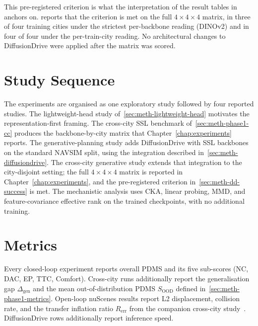 \noindent
This pre-registered criterion is what the interpretation of the result tables in  anchors on.  reports that the criterion is met on the full $4 \times 4 \times 4$ matrix, in three of four training cities under the strictest per-backbone reading (DINOv2) and in four of four under the per-train-city reading. No architectural changes to DiffusionDrive were applied after the matrix was scored.

\section{Study Sequence}
\label{sec:meth-exp-protocol}

The experiments are organised as one exploratory study followed by four reported studies. The lightweight-head study of~\ref{sec:meth-lightweight-head} motivates the representation-first framing. The cross-city SSL benchmark of~\ref{sec:meth-phase1-cc} produces the backbone-by-city matrix that Chapter~\ref{chap:experiments} reports. The generative-planning study adds DiffusionDrive with SSL backbones on the standard NAVSIM split, using the integration described in~\ref{sec:meth-diffusiondrive}. The cross-city generative study extends that integration to the city-disjoint setting; the full $4 \times 4 \times 4$ matrix is reported in Chapter~\ref{chap:experiments}, and the pre-registered criterion in~\ref{sec:meth-dd-success} is met. The mechanistic analysis uses CKA, linear probing, MMD, and feature-covariance effective rank on the trained checkpoints, with no additional training.

\section{Metrics}
\label{sec:meth-metrics}

Every closed-loop experiment reports overall PDMS and its five sub-scores (NC, DAC, EP, TTC, Comfort). Cross-city runs additionally report the generalisation gap $\Delta_\text{gen}$ and the mean out-of-distribution PDMS $S_\text{OOD}$ defined in~\ref{sec:meth-phase1-metrics}. Open-loop nuScenes results report L2 displacement, collision rate, and the transfer inflation ratio $R_\text{err}$ from the companion cross-city study~\cite{naeinian-cross-city-2026}. DiffusionDrive rows additionally report inference speed.

